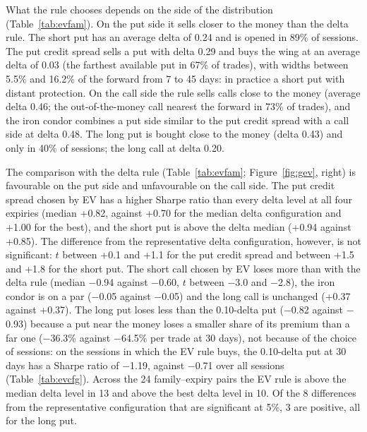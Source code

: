 \documentclass[11pt,a4paper]{article}
\begin{document}
What the rule chooses depends on the side of the distribution (Table~\ref{tab:evfam}). On the put side it sells closer to the money than the delta rule. The short put has an average delta of 0.24 and is opened in 89\% of sessions. The put credit spread sells a put with delta 0.29 and buys the wing at an average delta of 0.03 (the farthest available put in 67\% of trades), with widths between 5.5\% and 16.2\% of the forward from 7 to 45 days: in practice a short put with distant protection. On the call side the rule sells calls close to the money (average delta 0.46; the out-of-the-money call nearest the forward in 73\% of trades), and the iron condor combines a put side similar to the put credit spread with a call side at delta 0.48. The long put is bought close to the money (delta 0.43) and only in 40\% of sessions; the long call at delta 0.20.

The comparison with the delta rule (Table~\ref{tab:evfam}; Figure~\ref{fig:gev}, right) is favourable on the put side and unfavourable on the call side. The put credit spread chosen by EV has a higher Sharpe ratio than every delta level at all four expiries (median +0.82, against +0.70 for the median delta configuration and +1.00 for the best), and the short put is above the delta median (+0.94 against +0.85). The difference from the representative delta configuration, however, is not significant: $t$ between +0.1 and +1.1 for the put credit spread and between +1.5 and +1.8 for the short put. The short call chosen by EV loses more than with the delta rule (median $-$0.94 against $-$0.60, $t$ between $-$3.0 and $-$2.8), the iron condor is on a par ($-$0.05 against $-$0.05) and the long call is unchanged (+0.37 against +0.37). The long put loses less than the 0.10-delta put ($-$0.82 against $-$0.93) because a put near the money loses a smaller share of its premium than a far one ($-$36.3\% against $-$64.5\% per trade at 30 days), not because of the choice of sessions: on the sessions in which the EV rule buys, the 0.10-delta put at 30 days has a Sharpe ratio of $-$1.19, against $-$0.71 over all sessions (Table~\ref{tab:evcfg}). Across the 24 family--expiry pairs the EV rule is above the median delta level in 13 and above the best delta level in 10. Of the 8 differences from the representative configuration that are significant at 5\%, 3 are positive, all for the long put.
\end{document}

